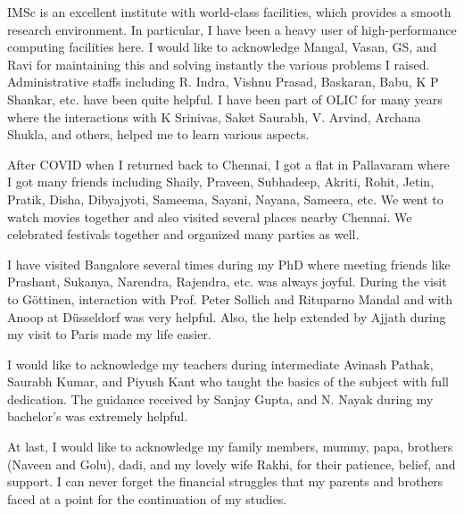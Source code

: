 IMSc is an excellent institute with world-class facilities, which provides a smooth research environment. In particular, I have been a heavy user of high-performance computing facilities here. I would like to acknowledge Mangal, Vasan, GS, and Ravi for maintaining this and solving instantly the various problems I raised. Administrative staffs including R. Indra, Vishnu Prasad, Baskaran, Babu, K P Shankar, etc. have been quite helpful. I have been part of OLIC for many years where the interactions with K Srinivas, Saket Saurabh, V. Arvind, Archana Shukla, and others, helped me to learn various aspects.

After COVID when I returned back to Chennai, I got a flat in Pallavaram where I got many friends including Shaily, Praveen, Subhadeep, Akriti, Rohit, Jetin, Pratik, Disha, Dibyajyoti, Sameema, Sayani, Nayana, Sameera, etc. We went to watch movies together and also visited several places nearby Chennai. We celebrated festivals together and organized many parties as well. 

I have visited Bangalore several times during my PhD where meeting friends like Prashant, Sukanya, Narendra, Rajendra, etc. was always joyful. During the visit to G\"ottinen, interaction with Prof. Peter Sollich and Rituparno Mandal and with Anoop at D\"usseldorf was very helpful. Also, the help extended by Ajjath during my visit to Paris made my life easier.

I would like to acknowledge my teachers during intermediate Avinash Pathak, Saurabh Kumar, and Piyush Kant who taught the basics of the subject with full dedication. The guidance received by Sanjay Gupta, and N. Nayak during my bachelor's was extremely helpful.

At last, I would like to acknowledge my family members, mummy, papa, brothers (Naveen and Golu), dadi, and my lovely wife Rakhi, for their patience, belief, and support. I can never forget the financial struggles that my parents and brothers faced at a point for the continuation of my studies.